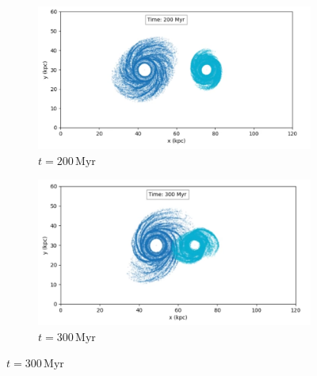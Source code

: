 \begin{figure}[htp]
    \centering
    \begin{subfigure}[b]{0.8\textwidth}
        \centering
        \includegraphics[width=\textwidth]{chapters/results/img/bh-collision/200myr.png}
        \caption{$t=200\,\text{Myr}$}
        \label{fig:collision-bh-sub1}
    \end{subfigure}

    \vspace{0.2cm}

    \begin{subfigure}[b]{0.8\textwidth}
        \centering
        \includegraphics[width=\textwidth]{chapters/results/img/bh-collision/300myr.png}
        \caption{$t=300\,\text{Myr}$}
        \label{fig:collision-bh-sub2}
    \end{subfigure}

    \vspace{0.2cm}


\end{figure}
